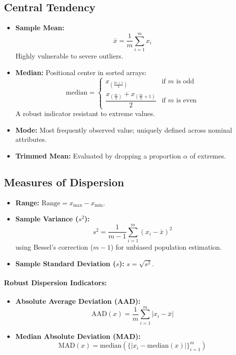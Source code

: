\subsection{Central Tendency}
\begin{itemize}
    \item \textbf{Sample Mean:}
    \begin{equation}
        \bar{x} = \frac{1}{m} \sum_{i=1}^m x_i
    \end{equation}
    Highly vulnerable to severe outliers.
    \item \textbf{Median:} Positional center in sorted arrays:
    \begin{equation}
        \text{median} = \begin{cases}
        x_{\left(\frac{m+1}{2}\right)} & \text{if } m \text{ is odd} \\[6pt]
        \dfrac{x_{\left(\frac{m}{2}\right)} + x_{\left(\frac{m}{2} + 1\right)}}{2} & \text{if } m \text{ is even}
        \end{cases}
    \end{equation}
    A robust indicator resistant to extreme values.
    \item \textbf{Mode:} Most frequently observed value; uniquely defined across nominal attributes.
    \item \textbf{Trimmed Mean:} Evaluated by dropping a proportion $\alpha$ of extremes.
\end{itemize}

\subsection{Measures of Dispersion}
\begin{itemize}
    \item \textbf{Range:} $\text{Range} = x_{\max} - x_{\min}$.
    \item \textbf{Sample Variance ($s^2$):}
    \begin{equation}
        s^2 = \frac{1}{m-1} \sum_{i=1}^m (x_i - \bar{x})^2
    \end{equation}
    using Bessel's correction ($m-1$) for unbiased population estimation.
    \item \textbf{Sample Standard Deviation ($s$):} $s = \sqrt{s^2}$.
\end{itemize}

\paragraph{Robust Dispersion Indicators:}
\begin{itemize}
    \item \textbf{Absolute Average Deviation (AAD):}
    \begin{equation}
        \text{AAD}(x) = \frac{1}{m} \sum_{i=1}^m |x_i - \bar{x}|
    \end{equation}
    \item \textbf{Median Absolute Deviation (MAD):}
    \begin{equation}
        \text{MAD}(x) = \text{median}\left(\Big\{|x_i - \text{median}(x)|\Big\}_{i=1}^m\right)
    \end{equation}
\end{itemize}

